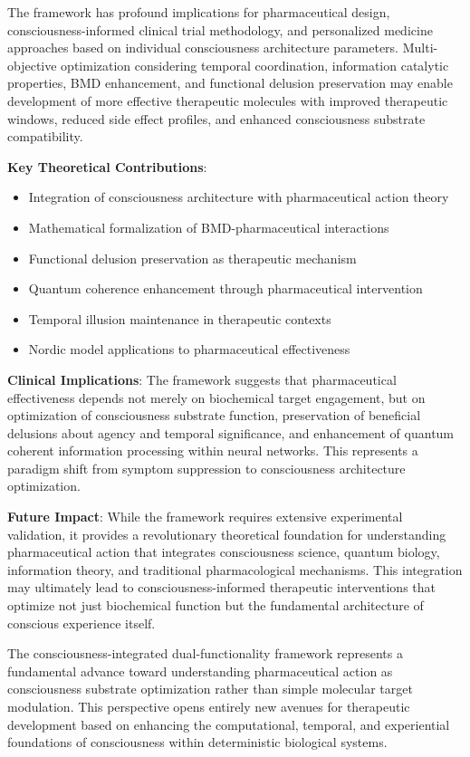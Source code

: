 \documentclass[12pt,a4paper]{article}
\begin{document}
The framework has profound implications for pharmaceutical design, consciousness-informed clinical trial methodology, and personalized medicine approaches based on individual consciousness architecture parameters. Multi-objective optimization considering temporal coordination, information catalytic properties, BMD enhancement, and functional delusion preservation may enable development of more effective therapeutic molecules with improved therapeutic windows, reduced side effect profiles, and enhanced consciousness substrate compatibility.

\textbf{Key Theoretical Contributions}:
\begin{itemize}
\item Integration of consciousness architecture with pharmaceutical action theory
\item Mathematical formalization of BMD-pharmaceutical interactions
\item Functional delusion preservation as therapeutic mechanism
\item Quantum coherence enhancement through pharmaceutical intervention
\item Temporal illusion maintenance in therapeutic contexts
\item Nordic model applications to pharmaceutical effectiveness
\end{itemize}

\textbf{Clinical Implications}:
The framework suggests that pharmaceutical effectiveness depends not merely on biochemical target engagement, but on optimization of consciousness substrate function, preservation of beneficial delusions about agency and temporal significance, and enhancement of quantum coherent information processing within neural networks. This represents a paradigm shift from symptom suppression to consciousness architecture optimization.

\textbf{Future Impact}:
While the framework requires extensive experimental validation, it provides a revolutionary theoretical foundation for understanding pharmaceutical action that integrates consciousness science, quantum biology, information theory, and traditional pharmacological mechanisms. This integration may ultimately lead to consciousness-informed therapeutic interventions that optimize not just biochemical function but the fundamental architecture of conscious experience itself.

The consciousness-integrated dual-functionality framework represents a fundamental advance toward understanding pharmaceutical action as consciousness substrate optimization rather than simple molecular target modulation. This perspective opens entirely new avenues for therapeutic development based on enhancing the computational, temporal, and experiential foundations of consciousness within deterministic biological systems.
\end{document}
